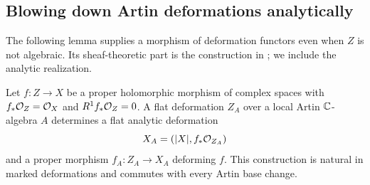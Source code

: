\subsection{Blowing down Artin deformations analytically}

The following lemma supplies a morphism of deformation functors even
when $Z$ is not algebraic.  Its sheaf-theoretic part is the construction
in \cite[Proposition~2.12 and Corollary~2.13]{sano2017}; we include the
analytic realization.

\begin{lemma}\label{lem04:blowdown}
Let $f:Z\to X$ be a proper holomorphic morphism of complex spaces with
$f_*\mathcal{O}_Z=\mathcal{O}_X$ and $R^1f_*\mathcal{O}_Z=0$.  A flat deformation $Z_A$ over
a local Artin $\mathbb{C}$-algebra $A$ determines a flat analytic deformation
\[
 X_A=(|X|,f_*\mathcal{O}_{Z_A})
\]
and a proper morphism $f_A:Z_A\to X_A$ deforming $f$.  This construction
is natural in marked deformations and commutes with every Artin base
change.
\end{lemma}

